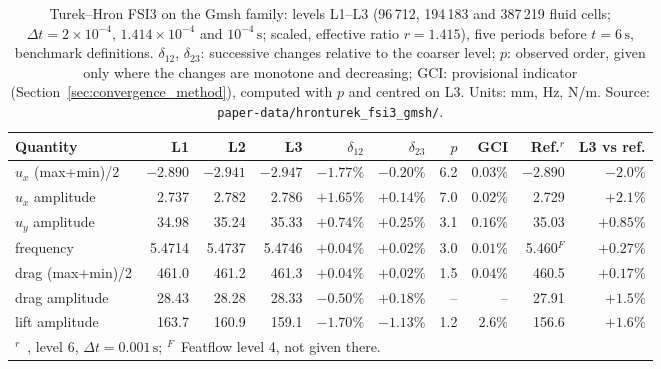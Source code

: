 \begin{table}[htbp]
	\centering
	\footnotesize
	\setlength{\tabcolsep}{3pt}
	\caption{Turek--Hron FSI3 on the Gmsh family: levels L1--L3 (96\,712, 194\,183 and 387\,219 fluid cells; $\Delta t = 2\times10^{-4}$, $1.414\times10^{-4}$ and $10^{-4}\,\mathrm{s}$; scaled, effective ratio $r = 1.415$), five periods before $t = 6\,\mathrm{s}$, benchmark definitions. $\delta_{12}$, $\delta_{23}$: successive changes relative to the coarser level; $p$: observed order, given only where the changes are monotone and decreasing; GCI: provisional indicator (Section~\ref{sec:convergence_method}), computed with $p$ and centred on L3. Units: mm, Hz, N/m. Source: \texttt{paper-data/hronturek\_fsi3\_gmsh/}.}
	\label{tab:hronturek_gmsh}
	\begin{tabular}{lrrrrrrrrr}
		\toprule
		Quantity & L1 & L2 & L3 & $\delta_{12}$ & $\delta_{23}$ & $p$ & GCI & Ref.$^r$ & L3 vs ref. \\
		\midrule
		$u_x$ (max+min)/2 & $-2.890$ & $-2.941$ & $-2.947$ & $-1.77\%$ & $-0.20\%$ & 6.2 & $0.03\%$ & $-2.890$ & $-2.0\%$ \\
		$u_x$ amplitude & 2.737 & 2.782 & 2.786 & $+1.65\%$ & $+0.14\%$ & 7.0 & $0.02\%$ & 2.729 & $+2.1\%$ \\
		$u_y$ amplitude & 34.98 & 35.24 & 35.33 & $+0.74\%$ & $+0.25\%$ & 3.1 & $0.16\%$ & 35.03 & $+0.85\%$ \\
		frequency & 5.4714 & 5.4737 & 5.4746 & $+0.04\%$ & $+0.02\%$ & 3.0 & $0.01\%$ & 5.460$^F$ & $+0.27\%$ \\
		drag (max+min)/2 & 461.0 & 461.2 & 461.3 & $+0.04\%$ & $+0.02\%$ & 1.5 & $0.04\%$ & 460.5 & $+0.17\%$ \\
		drag amplitude & 28.43 & 28.28 & 28.33 & $-0.50\%$ & $+0.18\%$ & -- & -- & 27.91 & $+1.5\%$ \\
		lift amplitude & 163.7 & 160.9 & 159.1 & $-1.70\%$ & $-1.13\%$ & 1.2 & $2.6\%$ & 156.6 & $+1.6\%$ \\
		\bottomrule
		\multicolumn{10}{l}{\footnotesize $^r$~\citet{Failer2020}, level 6, $\Delta t = 0.001\,\mathrm{s}$; $^F$~Featflow level 4, not given there.}
	\end{tabular}
\end{table}

